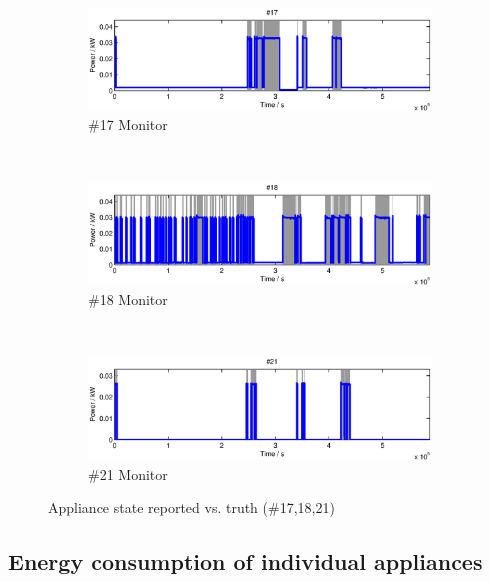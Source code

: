\begin{figure}[p]
    \centering
    \begin{subfigure}[t]{0.8\textwidth}
        \centering
        \includegraphics[width=\textwidth] {../../sw/pc/matlab/disagg-result/state-17.eps}
        \caption{\#17 Monitor}
    \end{subfigure} 
    \\
    \begin{subfigure}[t]{0.8\textwidth}
        \centering
        \includegraphics[width=\textwidth] {../../sw/pc/matlab/disagg-result/state-18.eps}
        \caption{\#18 Monitor}
    \end{subfigure}
    \\
    \begin{subfigure}[t]{0.8\textwidth}
        \centering
        \includegraphics[width=\textwidth] {../../sw/pc/matlab/disagg-result/state-21.eps}
        \caption{\#21 Monitor}
    \end{subfigure}
    \caption{Appliance state reported vs. truth (\#17,18,21)}\label{fig:state-17-18-21}
\end{figure}


\subsection{Energy consumption of individual appliances}

